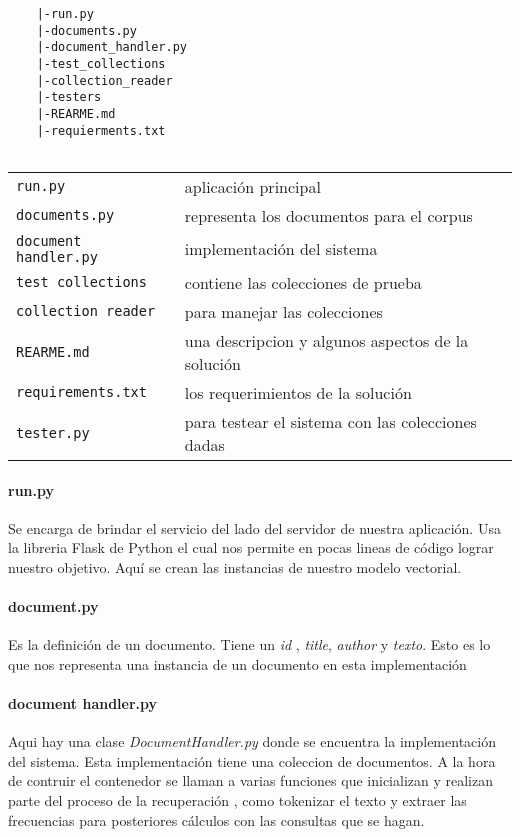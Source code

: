\documentclass{llncs}
\begin{document}
	\begin{verbatim}
	|-run.py
	|-documents.py
	|-document_handler.py
	|-test_collections
	|-collection_reader
	|-testers
	|-REARME.md
	|-requierments.txt
	
	\end{verbatim}
	
	\begin{flushleft}
		\begin{tabular}{@{}p{4cm}l}
			{\tt run.py}  & aplicaci\'on principal\\
			{\tt documents.py}  & representa los documentos para el corpus\\[2pt]
			{\tt document handler.py}& implementaci\'on del sistema\\[2pt]
			{\tt test collections}  & contiene las colecciones de prueba \\[2pt]
			{\tt collection reader}  & para manejar las colecciones \\[2pt]
			{\tt REARME.md}  & una descripcion y algunos aspectos de la soluci\'on \\[2pt]
			{\tt requirements.txt}& los requerimientos de la soluci\'on\\[2pt]			
			{\tt tester.py}  & para testear el sistema con las colecciones dadas\\
		\end{tabular}
	\end{flushleft}
	
	
	\paragraph{run.py} 
	Se encarga de brindar el servicio del lado del servidor de nuestra aplicaci\'on. Usa la libreria Flask de Python el cual nos permite en pocas lineas de c\'odigo lograr nuestro objetivo. Aqu\'i se crean las instancias de nuestro modelo vectorial.
	
	
	\paragraph{document.py}
	Es la definici\'on de un documento. Tiene un \textit{id} , \textit{title}, \textit{author} y \textit{texto}. Esto es lo que nos representa una instancia de un documento en esta  implementaci\'on
	
	\paragraph{document handler.py}
	Aqui hay una clase \textit{DocumentHandler.py} donde se encuentra la implementaci\'on del sistema. Esta implementaci\'on tiene una coleccion de documentos. A la hora de contruir el contenedor se llaman a varias funciones que inicializan y realizan parte del proceso de la recuperaci\'on , como tokenizar el texto y extraer las frecuencias para posteriores c\'alculos con las consultas que se hagan.
	
\end{document}
